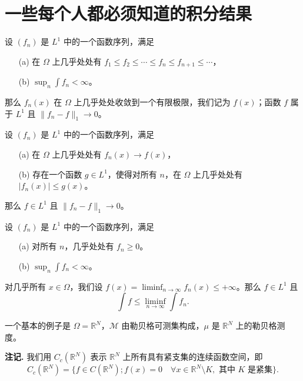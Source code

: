 \section{一些每个人都必须知道的积分结果}

\begin{theorem}\label{theorem4.1}
设 $(f_n)$ 是 $L^1$ 中的一个函数序列，满足
\begin{itemize}
    \item[(a)] 在 $\Omega$ 上几乎处处有 $f_1 \le f_2 \le \cdots \le f_n \le f_{n+1} \le \cdots$，
    \item[(b)] $\sup_n \int f_n < \infty$。
\end{itemize}
那么 $f_n(x)$ 在 $\Omega$ 上几乎处处收敛到一个有限极限，我们记为 $f(x)$；函数 $f$ 属于 $L^1$ 且 $\|f_n - f\|_1 \to 0$。
\end{theorem}

\begin{theorem}\label{theorem4.2}
设 $(f_n)$ 是 $L^1$ 中的一个函数序列，满足
\begin{itemize}
    \item[(a)] 在 $\Omega$ 上几乎处处有 $f_n(x) \to f(x)$，
    \item[(b)] 存在一个函数 $g \in L^1$，使得对所有 $n$，在 $\Omega$ 上几乎处处有 $|f_n(x)| \le g(x)$。
\end{itemize}
那么 $f \in L^1$ 且 $\|f_n - f\|_1 \to 0$。
\end{theorem}

\begin{lemma}[Fatou 引理]\label{lemma4.1}
设 $(f_n)$ 是 $L^1$ 中的一个函数序列，满足
\begin{itemize}
    \item[(a)] 对所有 $n$，几乎处处有 $f_n \ge 0$。
    \item[(b)] $\sup_n \int f_n < \infty$。
\end{itemize}
对几乎所有 $x \in \Omega$，我们设 $f(x) = \liminf_{n\to\infty} f_n(x) \le +\infty$。那么 $f \in L^1$ 且
\[ \int f \le \liminf_{n\to\infty} \int f_n. \]
\end{lemma}

一个基本的例子是 $\Omega = \mathbb{R}^N$，$\mathcal{M}$ 由勒贝格可测集构成，$\mu$ 是 $\mathbb{R}^N$ 上的勒贝格测度。

\textbf{注记.} 我们用 $C_c(\mathbb{R}^N)$ 表示 $\mathbb{R}^N$ 上所有具有紧支集的连续函数空间，即
\[ C_c(\mathbb{R}^N) = \{f \in C(\mathbb{R}^N); f(x)=0 \quad \forall x \in \mathbb{R}^N \setminus K, \text{ 其中 } K \text{ 是紧集}\}. \]

